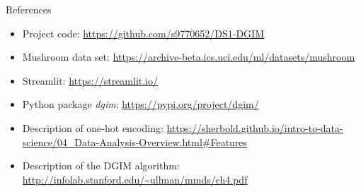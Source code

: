 \begin{frame}[t]{References}
	\begin{itemize}
		\item
		Project code:
		\url{https://github.com/s9770652/DS1-DGIM}
		
		\item
		Mushroom data set:
		\url{https://archive-beta.ics.uci.edu/ml/datasets/mushroom}
		
		\item
		Streamlit:
		\url{https://streamlit.io/}
		
		\item
		Python package \emph{dgim}:
		\url{https://pypi.org/project/dgim/}
		
		\item
		Description of one-hot encoding:
		\url{https://sherbold.github.io/intro-to-data-science/04_Data-Analysis-Overview.html\#Features}
		
		\item
		Description of the DGIM algorithm:
		\url{http://infolab.stanford.edu/~ullman/mmds/ch4.pdf}
	\end{itemize}
\end{frame}